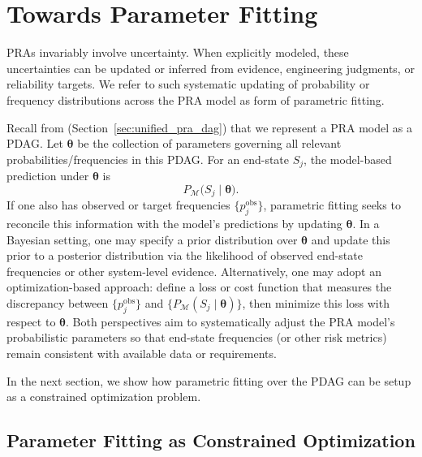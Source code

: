 \chapter{Towards Parameter Fitting}
\label{sec:parametric_learning_pra_model}

PRAs invariably involve uncertainty. When explicitly modeled, these uncertainties can be updated or inferred from evidence, engineering judgments, or reliability targets. We refer to such systematic updating of probability or frequency distributions across the PRA model as form of parametric fitting.

Recall from (Section~\ref{sec:unified_pra_dag}) that we represent a PRA model as a PDAG. Let \(\boldsymbol{\theta}\) be the collection of parameters governing all relevant probabilities/frequencies in this PDAG. For an end-state \(S_j\), the model-based prediction under \(\boldsymbol{\theta}\) is
\[
P_{\mathcal{M}}\bigl(S_j \mid \boldsymbol{\theta}\bigr).
\]
If one also has observed or target frequencies \(\bigl\{p_{j}^{\mathrm{obs}}\bigr\}\), parametric fitting seeks to reconcile this information with the model’s predictions by updating \(\boldsymbol{\theta}\). In a Bayesian setting, one may specify a prior distribution over \(\boldsymbol{\theta}\) and update this prior to a posterior distribution via the likelihood of observed end-state frequencies or other system-level evidence. Alternatively, one may adopt an optimization-based approach: define a loss or cost function that measures the discrepancy between \(\{p_{j}^{\mathrm{obs}}\}\) and \(\{P_{\mathcal{M}}(S_j \mid \boldsymbol{\theta})\}\), then minimize this loss with respect to \(\boldsymbol{\theta}\). Both perspectives aim to systematically adjust the PRA model’s probabilistic parameters so that end-state frequencies (or other risk metrics) remain consistent with available data or requirements. 

In the next section, we show how parametric fitting over the PDAG can be setup as a constrained optimization problem.

\section{Parameter Fitting as Constrained Optimization}
\label{sec:opt_formalization}

